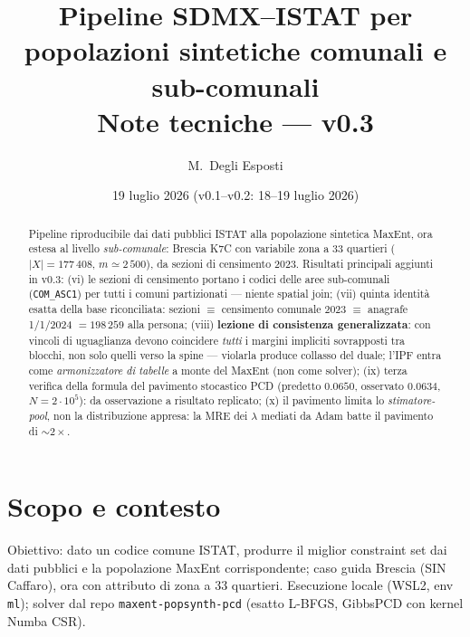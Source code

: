 \documentclass[11pt,a4paper]{article}
\title{\textbf{Pipeline SDMX--ISTAT per popolazioni sintetiche comunali e sub-comunali}\\[2mm]
\large Note tecniche --- v0.3}
\author{M.~Degli Esposti}
\date{19 luglio 2026 \quad (v0.1--v0.2: 18--19 luglio 2026)}
\newcommand{\code}[1]{\texttt{#1}}
\begin{document}
\maketitle

\begin{abstract}
\noindent
Pipeline riproducibile dai dati pubblici ISTAT alla popolazione sintetica
MaxEnt, ora estesa al livello \emph{sub-comunale}: Brescia K7C con variabile
zona a 33 quartieri ($|X|=177\,408$, $m\simeq2\,500$), da sezioni di
censimento 2023. Risultati principali aggiunti in v0.3:
(vi) le sezioni di censimento portano i codici delle aree sub-comunali
(\code{COM\_ASC1}) per tutti i comuni partizionati --- niente spatial join;
(vii) quinta identit\`a esatta della base riconciliata: sezioni $\equiv$
censimento comunale 2023 $\equiv$ anagrafe 1/1/2024 $=198\,259$ alla persona;
(viii) \textbf{lezione di consistenza generalizzata}: con vincoli di
uguaglianza devono coincidere \emph{tutti} i margini impliciti sovrapposti tra
blocchi, non solo quelli verso la spine --- violarla produce collasso del
duale; l'IPF entra come \emph{armonizzatore di tabelle} a monte del MaxEnt
(non come solver); (ix) terza verifica della formula del pavimento stocastico
PCD (predetto $0.0650$, osservato $0.0634$, $N=2\cdot10^5$): da osservazione a
risultato replicato; (x) il pavimento limita lo \emph{stimatore-pool}, non la
distribuzione appresa: la MRE dei $\lambda$ mediati da Adam batte il pavimento
di $\sim2\times$.
\end{abstract}

\tableofcontents

\section{Scopo e contesto}
Obiettivo: dato un codice comune ISTAT, produrre il miglior constraint set dai
dati pubblici e la popolazione MaxEnt corrispondente; caso guida Brescia (SIN
Caffaro), ora con attributo di zona a 33 quartieri. Esecuzione locale (WSL2,
env \code{ml}); solver dal repo \code{maxent-popsynth-pcd} (esatto L-BFGS,
GibbsPCD con kernel Numba CSR).

\end{document}
